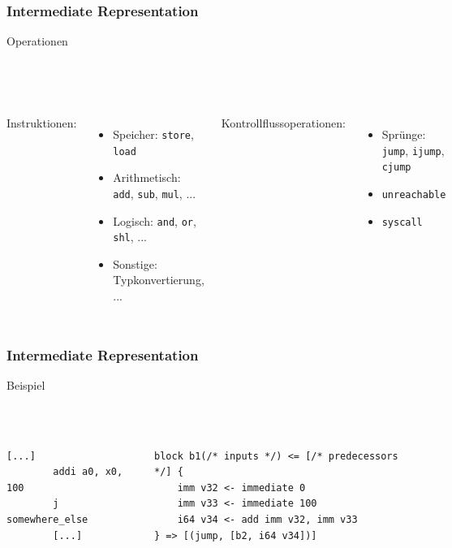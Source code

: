 \begin{frame}
    \frametitle{Intermediate Representation}{Operationen}

    ~\\
    ~\\

    \begin{columns}[c]
        Instruktionen:
        \begin{itemize}
            \item Speicher: \texttt{store}, \texttt{load}
            \item Arithmetisch: \texttt{add}, \texttt{sub}, \texttt{mul}, ...
            \item Logisch: \texttt{and}, \texttt{or}, \texttt{shl}, ...
            \item Sonstige: Typkonvertierung, ...
        \end{itemize}

        Kontrollflussoperationen:
        \begin{itemize}
            \item Sprünge: \texttt{jump}, \texttt{ijump}, \texttt{cjump}
            \item \texttt{unreachable}
            \item \texttt{syscall}
        \end{itemize}
    \end{columns}
\end{frame}


\begin{frame}[fragile]
    \frametitle{Intermediate Representation}{Beispiel}
    \pause{}
    ~\\
    ~\\
    ~\\
    \begin{columns}[c]
        \begin{lstlisting}[language=rv64]
        [...]
        addi a0, x0, 100
        j somewhere_else
        [...]
        \end{lstlisting}



        \begin{lstlisting}[language=SbtIr]
block b1(/* inputs */) <= [/* predecessors */] {
    imm v32 <- immediate 0
    imm v33 <- immediate 100
    i64 v34 <- add imm v32, imm v33
} => [(jump, [b2, i64 v34])]
    \end{lstlisting}
    \end{columns}

\end{frame}
\clearpage

